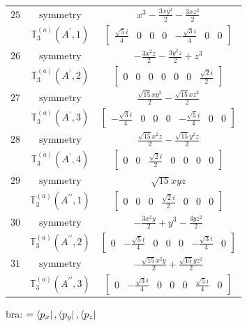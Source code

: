 \documentclass[fleqn,8pt,landscape]{jsarticle}
\begin{document}
\begin{longtable}{ccc}
$ 25 $ & $ \text{symmetry} $ & $ x^{3} - \frac{3 x y^{2}}{2} - \frac{3 x z^{2}}{2} $ \\
$  $ & $ \mathbb{T}_{3}^{(a)}(A^{\prime},1) $ & $ \begin{bmatrix} \frac{\sqrt{5} i}{4} & 0 & 0 & 0 & - \frac{\sqrt{3} i}{4} & 0 & 0 \end{bmatrix} $ \\ \hline
$ 26 $ & $ \text{symmetry} $ & $ - \frac{3 x^{2} z}{2} - \frac{3 y^{2} z}{2} + z^{3} $ \\
$  $ & $ \mathbb{T}_{3}^{(a)}(A^{\prime},2) $ & $ \begin{bmatrix} 0 & 0 & 0 & 0 & 0 & 0 & \frac{\sqrt{2} i}{2} \end{bmatrix} $ \\ \hline
$ 27 $ & $ \text{symmetry} $ & $ \frac{\sqrt{15} x y^{2}}{2} - \frac{\sqrt{15} x z^{2}}{2} $ \\
$  $ & $ \mathbb{T}_{3}^{(a)}(A^{\prime},3) $ & $ \begin{bmatrix} - \frac{\sqrt{3} i}{4} & 0 & 0 & 0 & - \frac{\sqrt{5} i}{4} & 0 & 0 \end{bmatrix} $ \\ \hline
$ 28 $ & $ \text{symmetry} $ & $ \frac{\sqrt{15} x^{2} z}{2} - \frac{\sqrt{15} y^{2} z}{2} $ \\
$  $ & $ \mathbb{T}_{3}^{(a)}(A^{\prime},4) $ & $ \begin{bmatrix} 0 & 0 & \frac{\sqrt{2} i}{2} & 0 & 0 & 0 & 0 \end{bmatrix} $ \\ \hline
$ 29 $ & $ \text{symmetry} $ & $ \sqrt{15} x y z $ \\
$  $ & $ \mathbb{T}_{3}^{(a)}(A^{\prime\prime},1) $ & $ \begin{bmatrix} 0 & 0 & 0 & \frac{\sqrt{2} i}{2} & 0 & 0 & 0 \end{bmatrix} $ \\ \hline
$ 30 $ & $ \text{symmetry} $ & $ - \frac{3 x^{2} y}{2} + y^{3} - \frac{3 y z^{2}}{2} $ \\
$  $ & $ \mathbb{T}_{3}^{(a)}(A^{\prime\prime},2) $ & $ \begin{bmatrix} 0 & - \frac{\sqrt{5} i}{4} & 0 & 0 & 0 & - \frac{\sqrt{3} i}{4} & 0 \end{bmatrix} $ \\ \hline
$ 31 $ & $ \text{symmetry} $ & $ - \frac{\sqrt{15} x^{2} y}{2} + \frac{\sqrt{15} y z^{2}}{2} $ \\
$  $ & $ \mathbb{T}_{3}^{(a)}(A^{\prime\prime},3) $ & $ \begin{bmatrix} 0 & - \frac{\sqrt{3} i}{4} & 0 & 0 & 0 & \frac{\sqrt{5} i}{4} & 0 \end{bmatrix} $ \\ \hline
\end{longtable}
bra: $=\bra{p_{x}}, \bra{p_{y}}, \bra{p_{z}}$
\end{document}
